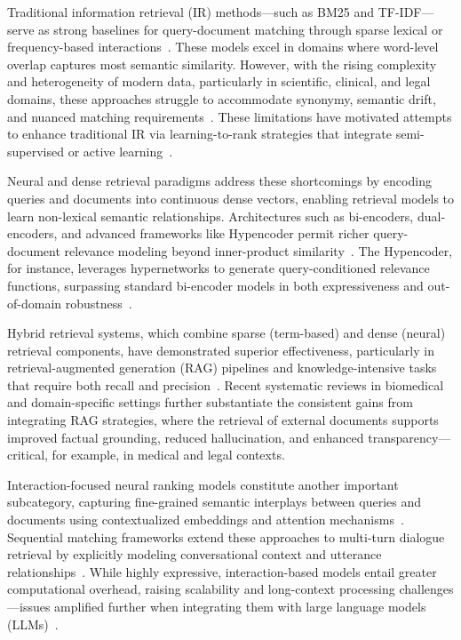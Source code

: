 \documentclass[sigconf]{acmart}
\begin{document}
Traditional information retrieval (IR) methods—such as BM25 and TF-IDF—serve as strong baselines for query-document matching through sparse lexical or frequency-based interactions~\cite{ref42,ref44,ref52}. These models excel in domains where word-level overlap captures most semantic similarity. However, with the rising complexity and heterogeneity of modern data, particularly in scientific, clinical, and legal domains, these approaches struggle to accommodate synonymy, semantic drift, and nuanced matching requirements~\cite{ref43,ref44,ref52}. These limitations have motivated attempts to enhance traditional IR via learning-to-rank strategies that integrate semi-supervised or active learning~\cite{ref44}.

Neural and dense retrieval paradigms address these shortcomings by encoding queries and documents into continuous dense vectors, enabling retrieval models to learn non-lexical semantic relationships. Architectures such as bi-encoders, dual-encoders, and advanced frameworks like Hypencoder permit richer query-document relevance modeling beyond inner-product similarity~\cite{ref4,ref5,ref8,ref10,ref14,ref15,ref16,ref17,ref22,ref26,ref28,ref36,ref37,ref38,ref43,ref52,ref54,ref55}. The Hypencoder, for instance, leverages hypernetworks to generate query-conditioned relevance functions, surpassing standard bi-encoder models in both expressiveness and out-of-domain robustness~\cite{ref28}.

Hybrid retrieval systems, which combine sparse (term-based) and dense (neural) retrieval components, have demonstrated superior effectiveness, particularly in retrieval-augmented generation (RAG) pipelines and knowledge-intensive tasks that require both recall and precision~\cite{ref4,ref5,ref8,ref10,ref14,ref22,ref26,ref36,ref42,ref43,ref52,ref54}. Recent systematic reviews in biomedical~\cite{ref5,ref52} and domain-specific settings further substantiate the consistent gains from integrating RAG strategies, where the retrieval of external documents supports improved factual grounding, reduced hallucination, and enhanced transparency—critical, for example, in medical and legal contexts.

Interaction-focused neural ranking models constitute another important subcategory, capturing fine-grained semantic interplays between queries and documents using contextualized embeddings and attention mechanisms~\cite{ref5,ref8,ref10,ref14,ref15,ref16,ref17,ref22,ref26,ref28,ref36,ref37,ref38,ref43,ref52,ref54,ref55}. Sequential matching frameworks extend these approaches to multi-turn dialogue retrieval by explicitly modeling conversational context and utterance relationships~\cite{ref17,ref43}. While highly expressive, interaction-based models entail greater computational overhead, raising scalability and long-context processing challenges—issues amplified further when integrating them with large language models (LLMs)~\cite{ref54,ref55}.
\end{document}
